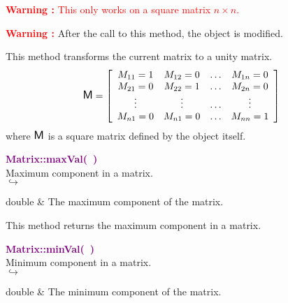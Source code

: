\hspace*{10mm}\textcolor{red}{\textbf{Warning :} This only works on a square matrix $n \times n$.}

\hspace*{10mm}\textcolor{red}{\textbf{Warning :}} After the call to this method, the object is modified.

This method transforms the current matrix to a unity matrix.
\begin{equation*}
\mbox{\large\ensuremath{\mathsf{M}}}=\left[\begin{array}{cccc}
  M_{11}=1 & M_{12}=0 & \hdots & M_{1n}=0\\
  M_{21}=0 & M_{22}=1 & \hdots & M_{2n}=0\\
  \vdots & \vdots & \hdots & \vdots\\
  M_{n1}=0 & M_{n1}=0 & \hdots & M_{nn}=1
  \end{array}\right]
\end{equation*}
where $\mbox{\large\ensuremath{\mathsf{M}}}$ is a square matrix defined by the object itself.

\textcolor{purple}{\textbf{Matrix::maxVal(~)}}\label{Matrix::maxVal()}\\
Maximum component in a matrix.\\ \hspace*{5mm}$\hookrightarrow$
\vspace*{-2em}\begin{tcolorbox}[grow to left by=-1cm, width=\textwidth-1cm,myArgs,tabularx={l|R}]
double & The maximum component of the matrix.
\end{tcolorbox}

This method returns the maximum component in a matrix.

\textcolor{purple}{\textbf{Matrix::minVal(~)}}\label{Matrix::minVal()}\\
Minimum component in a matrix.\\ \hspace*{5mm}$\hookrightarrow$
\vspace*{-2em}\begin{tcolorbox}[grow to left by=-1cm, width=\textwidth-1cm,myArgs,tabularx={l|R}]
double & The minimum component of the matrix.
\end{tcolorbox}

